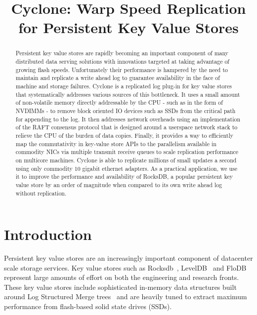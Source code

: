 \documentclass[pageno]{jpaper}
\begin{document}
\title{\Large \bf Cyclone: Warp Speed Replication for Persistent Key Value Stores}


\date{}
\maketitle

\thispagestyle{empty}

\begin{abstract}
\vspace{0.1in}
Persistent key value stores are rapidly becoming an important component of many
distributed data serving solutions with innovations targeted at taking advantage
of growing flash speeds. Unfortunately their performance is hampered by the need
to maintain and replicate a write ahead log to guarantee availability in the
face of machine and storage failures. Cyclone is a replicated log plug-in for
key value stores that systematically addresses various sources of this
bottleneck. It uses a small amount of non-volatile memory directly addressable
by the CPU - such as in the form of NVDIMMs - to remove block oriented IO
devices such as SSDs from the critical path for appending to the log. It then
addresses network overheads using an implementation of the RAFT consensus
protocol that is designed around a userspace network stack to relieve the CPU of
the burden of data copies. Finally, it provides a way to efficiently map the
commutativity in key-value store APIs to the parallelism available in commodity
NICs via multiple transmit receive queues to scale replication performance on
multicore machines. Cyclone is able to replicate millions of small updates a
second using only commodity 10 gigabit ethernet adapters. As a practical
application, we use it to improve the performance and availability of RocksDB, a
popular persistent key value store by an order of magnitude when compared to its
own write ahead log without replication.
\end{abstract}

\section{Introduction}
Persistent key value stores are an increasingly important component of
datacenter scale storage services. Key value stores such as
Rocksdb~\cite{rocksdb}, LevelDB~\cite{leveldb} and FloDB~\cite{flodb} represent
large amounts of effort on both the engineering and research fronts. These key
value stores include sophisticated in-memory data structures built around Log
Structured Merge trees~\cite{lsmtree} and are heavily tuned to extract maximum
performance from flash-based solid state drives (SSDs).
\end{document}
